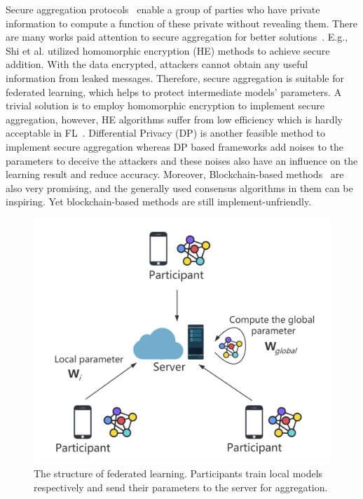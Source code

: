 Secure aggregation protocols~\cite{shi2011privacy} enable a group of parties who have private information to compute a function of these private without revealing them. There are many works paid attention to secure aggregation for better solutions~\cite{shi2011privacy,RobustAgg,Bonawitz19,Nike,PrivFL}. E.g., Shi et al.\cite{shi2011privacy} utilized homomorphic encryption (HE) methods to achieve secure addition. With the data encrypted, attackers cannot obtain any useful information from leaked messages. Therefore, secure aggregation is suitable for federated learning, which helps to protect intermediate models' parameters. A trivial solution is to employ homomorphic encryption to implement secure aggregation, however, HE algorithms suffer from low efficiency which is hardly acceptable in FL~\cite{HESurvey}. Differential Privacy (DP) is another feasible method to implement secure aggregation whereas DP based frameworks add noises to the parameters to deceive the attackers and these noises also have an influence on the learning result and reduce accuracy. Moreover, Blockchain-based methods~\cite{DeepChain,Lu2020,On-Device} are also very promising, and the generally used consensus algorithms in them can be inspiring. Yet blockchain-based methods are still implement-unfriendly. 

\begin{figure}[!ht]
    \centering
    \includegraphics[width=\columnwidth]{img/fed.png}
    \caption{The structure of federated learning. Participants train local models respectively and send their parameters to the server for aggregation.}
    \label{fed}
\end{figure}

